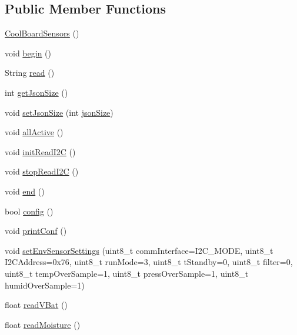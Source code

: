 \subsection*{Public Member Functions}
\begin{DoxyCompactItemize}
\item 
\hyperlink{classCoolBoardSensors_a91ff2a02f5486f90cf2413a1cf8a9ed4}{Cool\+Board\+Sensors} ()
\item 
void \hyperlink{classCoolBoardSensors_a97095823ef7c8f5290812f1405b966b3}{begin} ()
\item 
String \hyperlink{classCoolBoardSensors_a91badb2539d91fda8679f2a597874c48}{read} ()
\item 
int \hyperlink{classCoolBoardSensors_ab82c2a1633768ccd12a589320fa31a14}{get\+Json\+Size} ()
\item 
void \hyperlink{classCoolBoardSensors_ab76e6dbd6efbcc25ff460535badd8d45}{set\+Json\+Size} (int \hyperlink{classCoolBoardSensors_a05a40dc80bfff14ffb830f549b876f8d}{json\+Size})
\item 
void \hyperlink{classCoolBoardSensors_aa432c5aac88f89c31a10766390f23e0b}{all\+Active} ()
\item 
void \hyperlink{classCoolBoardSensors_acad6a8418c66d36868caca23c844ecb6}{init\+Read\+I2C} ()
\item 
void \hyperlink{classCoolBoardSensors_ab67b900b9e5e7c18d52d2d9107ba171b}{stop\+Read\+I2C} ()
\item 
void \hyperlink{classCoolBoardSensors_a4902b69f6e628bd6557193758fdd2bae}{end} ()
\item 
bool \hyperlink{classCoolBoardSensors_a9a218895c5423375c33c08f2c56fb23a}{config} ()
\item 
void \hyperlink{classCoolBoardSensors_af6fd79505815b204c178617ecf54c873}{print\+Conf} ()
\item 
void \hyperlink{classCoolBoardSensors_a406307ffd70272282d91479c7ed8d66f}{set\+Env\+Sensor\+Settings} (uint8\+\_\+t comm\+Interface=I2\+C\+\_\+\+M\+O\+DE, uint8\+\_\+t I2\+C\+Address=0x76, uint8\+\_\+t run\+Mode=3, uint8\+\_\+t t\+Standby=0, uint8\+\_\+t filter=0, uint8\+\_\+t temp\+Over\+Sample=1, uint8\+\_\+t press\+Over\+Sample=1, uint8\+\_\+t humid\+Over\+Sample=1)
\item 
float \hyperlink{classCoolBoardSensors_a6944b6ea7bce8e2fce1b434acfd9d5f3}{read\+V\+Bat} ()
\item 
float \hyperlink{classCoolBoardSensors_a8761bff50373c485f4465c8db47d0633}{read\+Moisture} ()
\end{DoxyCompactItemize}
